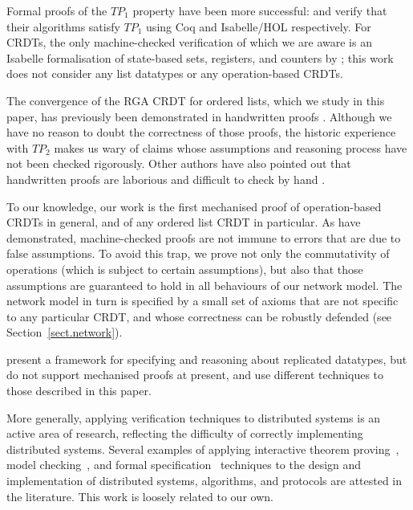 Formal proofs of the $\mathit{TP}_1$ property have been more successful: \citet{Sinchuk:2016cf} and \citet{Jungnickel:2015ua} verify that their algorithms satisfy $\mathit{TP}_1$ using Coq and Isabelle/HOL respectively.
For CRDTs, the only machine-checked verification of which we are aware is an Isabelle formalisation of state-based sets, registers, and counters by \citet{Zeller:2014fl}; this work does not consider any list datatypes or any operation-based CRDTs.

The convergence of the RGA CRDT for ordered lists, which we study in this paper, has previously been
demonstrated in handwritten proofs \cite{Attiya:2016kh,Kleppmann:2016ve,Roh:2009ws}. Although we
have no reason to doubt the correctness of those proofs, the historic experience with
$\mathit{TP}_2$ makes us wary of claims whose assumptions and reasoning process have not been
checked rigorously. Other authors have also pointed out that handwritten proofs are laborious and
difficult to check by hand \cite{Li:2008hw,Li:2005jq}.

To our knowledge, our work is the first mechanised proof of operation-based CRDTs in general, and of
any ordered list CRDT in particular. As \citet{Oster:2005vi} have demonstrated, machine-checked
proofs are not immune to errors that are due to false assumptions. To avoid this trap, we prove not
only the commutativity of operations (which is subject to certain assumptions), but also that those
assumptions are guaranteed to hold in all behaviours of our network model. The network model in turn
is specified by a small set of axioms that are not specific to any particular CRDT, and whose
correctness can be robustly defended (see Section~\ref{sect.network}).

\citet{Burckhardt:2014ft} present a framework for specifying and reasoning about replicated datatypes, but do not support mechanised proofs at present, and use different techniques to those described in this paper.

More generally, applying verification techniques to distributed systems is an active area of research, reflecting the difficulty of correctly implementing distributed systems.
Several examples of applying interactive theorem proving~\cite{DBLP:conf/pldi/WilcoxWPTWEA15,DBLP:journals/afp/DebratM12,DBLP:conf/sss/Charron-BostDM11}, model checking~\cite{DBLP:conf/asm/AzmyMW16,DBLP:journals/entcs/JohnsonLLV04}, and formal specification~\cite{DBLP:journals/ijaacs/TounsiMM16,DBLP:conf/asm/AndriamiarinaMS14,DBLP:conf/wetice/TounsiMM13} techniques to the design and implementation of distributed systems, algorithms, and protocols are attested in the literature.
This work is loosely related to our own.
